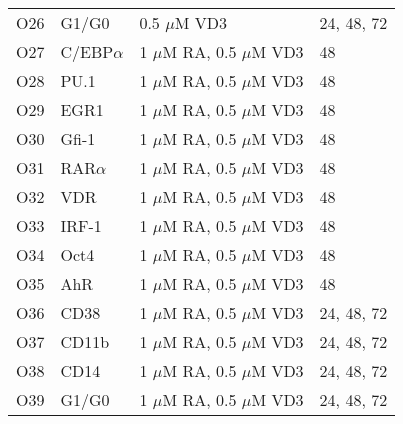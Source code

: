 \begin{center}
\begin{scriptsize}
\begin{supertabular}{|p{2cm}|p{3cm}|p{3cm}|p{3cm}|}
O26 &  G1/G0 & 0.5 $\mu$M VD3 & 24, 48, 72 \\
O27 & C/EBP$\alpha$ & 1 $\mu$M RA, 0.5 $\mu$M VD3 & 48 \\
O28 &  PU.1 & 1 $\mu$M RA, 0.5 $\mu$M VD3 & 48 \\
O29 &  EGR1 & 1 $\mu$M RA, 0.5 $\mu$M VD3 & 48 \\
O30 &  Gfi-1 & 1 $\mu$M RA, 0.5 $\mu$M VD3 & 48 \\
O31 &  RAR$\alpha$ & 1 $\mu$M RA, 0.5 $\mu$M VD3 & 48 \\
O32 &  VDR & 1 $\mu$M RA, 0.5 $\mu$M VD3 & 48 \\
O33 &  IRF-1 & 1 $\mu$M RA, 0.5 $\mu$M VD3 & 48 \\
O34 &  Oct4 & 1 $\mu$M RA, 0.5 $\mu$M VD3 & 48 \\
O35 &  AhR & 1 $\mu$M RA, 0.5 $\mu$M VD3 & 48 \\
O36 & CD38 & 1 $\mu$M RA, 0.5 $\mu$M VD3 & 24, 48, 72 \\
O37 &  CD11b & 1 $\mu$M RA, 0.5 $\mu$M VD3 & 24, 48, 72 \\
O38 &  CD14 & 1 $\mu$M RA, 0.5 $\mu$M VD3 & 24, 48, 72 \\
O39 &  G1/G0 & 1 $\mu$M RA, 0.5 $\mu$M VD3 & 24, 48, 72 \\

\hline
\end{supertabular}
\end{scriptsize}
\end{center}
%
